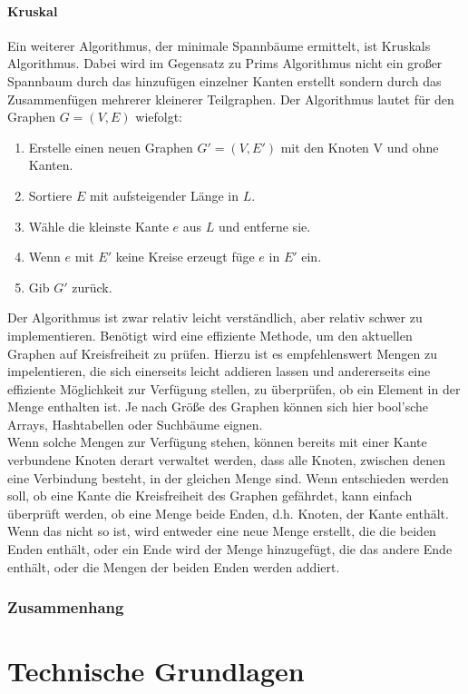 \documentclass{article}
\begin{document}
\paragraph{Kruskal}
Ein weiterer Algorithmus, der minimale Spannbäume ermittelt, ist Kruskals Algorithmus. Dabei wird im Gegensatz zu Prims Algorithmus nicht ein großer Spannbaum durch das hinzufügen einzelner Kanten erstellt sondern durch das Zusammenfügen mehrerer kleinerer Teilgraphen. Der Algorithmus lautet für den Graphen $G=(V,E)$ wiefolgt:
\begin{enumerate}
    \item Erstelle einen neuen Graphen $G'=(V, E')$ mit den Knoten V und ohne Kanten.
    \item Sortiere $E$ mit aufsteigender Länge in $L$.
    \item Wähle die kleinste Kante $e$ aus $L$ und entferne sie.
    \item Wenn $e$ mit $E'$ keine Kreise erzeugt füge $e$ in $E'$ ein.
    \item Gib $G'$ zurück.
\end{enumerate}
Der Algorithmus ist zwar relativ leicht verständlich, aber relativ schwer zu implementieren. Benötigt wird eine effiziente Methode, um den aktuellen Graphen auf Kreisfreiheit zu prüfen. Hierzu ist es empfehlenswert Mengen zu impelentieren, die sich einerseits leicht addieren lassen und andererseits eine effiziente Möglichkeit zur Verfügung stellen, zu überprüfen, ob ein Element in der Menge enthalten ist. Je nach Größe des Graphen können sich hier bool'sche Arrays, Hashtabellen oder Suchbäume eignen.\\
Wenn solche Mengen zur Verfügung stehen, können bereits mit einer Kante verbundene Knoten derart verwaltet werden, dass alle Knoten, zwischen denen eine Verbindung besteht, in der gleichen Menge sind. Wenn entschieden werden soll, ob eine Kante die Kreisfreiheit des Graphen gefährdet, kann einfach überprüft werden, ob eine Menge beide Enden, d.h. Knoten, der Kante enthält. Wenn das nicht so ist, wird entweder eine neue Menge erstellt, die die beiden Enden enthält, oder ein Ende wird der Menge hinzugefügt, die das andere Ende enthält, oder die Mengen der beiden Enden werden addiert.
\subsubsection{Zusammenhang}
\section{Technische Grundlagen}
\end{document}
